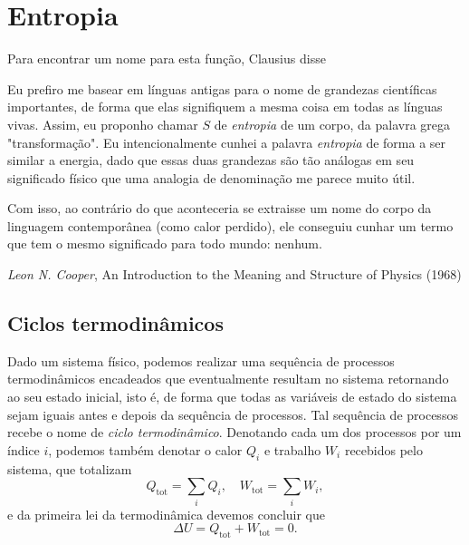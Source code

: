 \section{Entropia}

\epigraph{\justifying Para encontrar um nome para esta função, Clausius disse
\begin{displayquote}
    Eu prefiro me basear em línguas antigas para o nome de grandezas científicas
    importantes, de forma que elas signifiquem a mesma coisa em todas as línguas
    vivas. Assim, eu proponho chamar $S$ de \emph{entropia} de um corpo, da
    palavra grega "transformação". Eu intencionalmente cunhei a palavra \emph{
    entropia} de forma a ser similar a energia, dado que essas duas grandezas
    são tão análogas em seu significado físico que uma analogia de denominação
    me parece muito útil.
\end{displayquote}
Com isso, ao contrário do que aconteceria se extraisse um nome do corpo da
linguagem contemporânea (como calor perdido), ele conseguiu cunhar um termo que
tem o mesmo significado para todo mundo: nenhum.}{\emph{Leon N. Cooper}, An
Introduction to the Meaning and Structure of Physics (1968)}

\subsection{Ciclos termodinâmicos}

Dado um sistema físico, podemos realizar uma sequência de processos
termodinâmicos encadeados que eventualmente resultam no sistema retornando ao
seu estado inicial, isto é, de forma que todas as variáveis de estado do sistema
sejam iguais antes e depois da sequência de processos. Tal sequência de
processos recebe o nome de \emph{ciclo termodinâmico}. Denotando cada um dos
processos por um índice $i$, podemos também denotar o calor $Q_i$ e trabalho
$W_i$ recebidos pelo sistema, que totalizam
$$Q_\text{tot}=\sum_iQ_i,\quad W_\text{tot}=\sum_iW_i,$$
e da primeira lei da termodinâmica devemos concluir que
$$\Delta U=Q_\text{tot}+W_\text{tot}=0.$$

